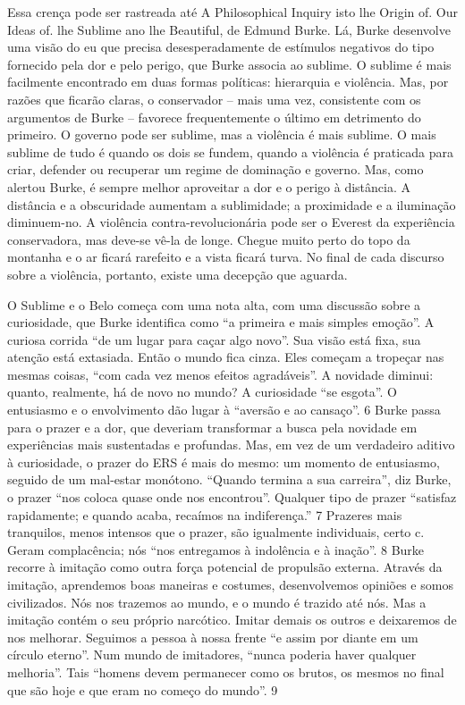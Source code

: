 Essa crença pode ser rastreada até A Philosophical Inquiry isto lhe Origin of. Our Ideas of. lhe Sublime ano lhe Beautiful, de Edmund Burke. Lá, Burke desenvolve uma visão do eu que precisa desesperadamente de estímulos negativos do tipo fornecido pela dor e pelo perigo, que Burke associa ao sublime. O sublime é mais facilmente encontrado em duas formas políticas: hierarquia e violência. Mas, por razões que ficarão claras, o conservador – mais uma vez, consistente com os argumentos de Burke – favorece frequentemente o último em detrimento do primeiro. O governo pode ser sublime, mas a violência é mais sublime. O mais sublime de tudo é quando os dois se fundem, quando a violência é praticada para criar, defender ou recuperar um regime de dominação e governo. Mas, como alertou Burke, é sempre melhor aproveitar a dor e o perigo à distância. A distância e a obscuridade aumentam a sublimidade; a proximidade e a iluminação diminuem-no. A violência contra-revolucionária pode ser o Everest da experiência conservadora, mas deve-se vê-la de longe. Chegue muito perto do topo da montanha e o ar ficará rarefeito e a vista ficará turva. No final de cada discurso sobre a violência, portanto, existe uma decepção que aguarda.
 
\par
 
O Sublime e o Belo começa com uma nota alta, com uma discussão sobre a curiosidade, que Burke identifica como “a primeira e mais simples emoção”. A curiosa corrida “de um lugar para caçar algo novo”. Sua visão está fixa, sua atenção está extasiada. Então o mundo fica cinza. Eles começam a tropeçar nas mesmas coisas, “com cada vez menos efeitos agradáveis”. A novidade diminui: quanto, realmente, há de novo no mundo? A curiosidade “se esgota”. O entusiasmo e o envolvimento dão lugar à “aversão e ao cansaço”.
 {\color{blue} 6}  
Burke passa para o prazer e a dor, que deveriam transformar a busca pela novidade em experiências mais sustentadas e profundas. Mas, em vez de um verdadeiro aditivo à curiosidade, o prazer do ERS é mais do mesmo: um momento de entusiasmo, seguido de um mal-estar monótono. “Quando termina a sua carreira”, diz Burke, o prazer “nos coloca quase onde nos encontrou”. Qualquer tipo de prazer “satisfaz rapidamente; e quando acaba, recaímos na indiferença.”
 {\color{blue} 7}  
Prazeres mais tranquilos, menos intensos que o prazer, são igualmente individuais, certo c. Geram complacência; nós “nos entregamos à indolência e à inação”.
 {\color{blue} 8}  
Burke recorre à imitação como outra força potencial de propulsão externa. Através da imitação, aprendemos boas maneiras e costumes, desenvolvemos opiniões e somos civilizados. Nós nos trazemos ao mundo, e o mundo é trazido até nós. Mas a imitação contém o seu próprio narcótico. Imitar demais os outros e deixaremos de nos melhorar. Seguimos a pessoa à nossa frente “e assim por diante em um círculo eterno”. Num mundo de imitadores, “nunca poderia haver qualquer melhoria”. Tais “homens devem permanecer como os brutos, os mesmos no final que são hoje e que eram no começo do mundo”.
 {\color{blue} 9}  

